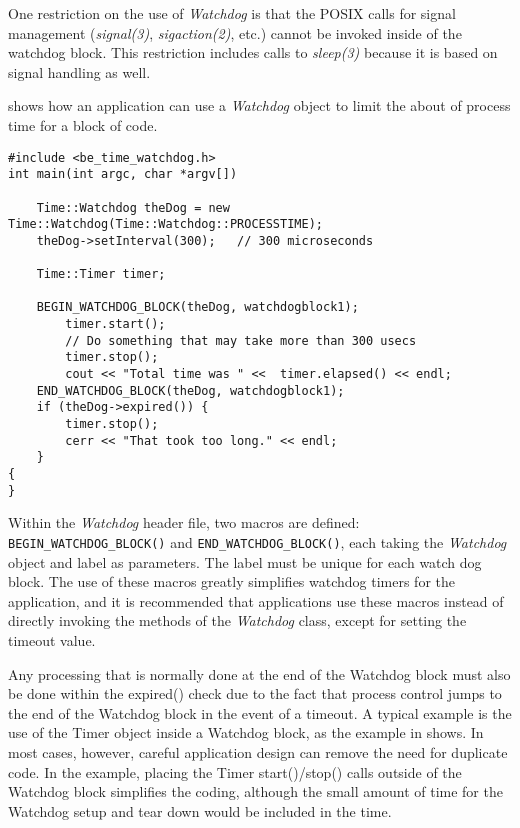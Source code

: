 One restriction on the use of {\em Watchdog} is that the POSIX calls for
signal management ({\em signal(3)}, {\em sigaction(2)}, etc.) cannot be
invoked inside of the watchdog block. This restriction includes calls to
{\em sleep(3)} because it is based on signal handling as well.

 shows how an application can use a {\em Watchdog}
object to limit the about of process time for a block of code.

\begin{lstlisting}[caption={Using the Watchdog}, label=watchdoguse]
#include <be_time_watchdog.h>
int main(int argc, char *argv[])

    Time::Watchdog theDog = new Time::Watchdog(Time::Watchdog::PROCESSTIME);
    theDog->setInterval(300);	// 300 microseconds

    Time::Timer timer;

    BEGIN_WATCHDOG_BLOCK(theDog, watchdogblock1);
        timer.start();
        // Do something that may take more than 300 usecs
        timer.stop();
        cout << "Total time was " <<  timer.elapsed() << endl;
    END_WATCHDOG_BLOCK(theDog, watchdogblock1);
    if (theDog->expired()) {
        timer.stop();
        cerr << "That took too long." << endl;
    }
{
}
\end{lstlisting}

Within the {\em Watchdog} header file, two macros are defined:
{\tt BEGIN\_WATCHDOG\_BLOCK()} and {\tt END\_WATCHDOG\_BLOCK()}, each taking
the {\em Watchdog} object and label as parameters. The label must be unique
for each watch dog block.  The use of these macros greatly simplifies
watchdog timers for the application, and it is recommended that applications
use these macros instead of directly invoking the methods of the
{\em Watchdog} class, except for setting the timeout value.

Any processing that is normally done at the end of the Watchdog block must also
be done within the expired() check
due to the fact that process control jumps to the end of the Watchdog block
in the event of a timeout.
A typical example is the use of the Timer
object inside a Watchdog block, as the example in 
shows. In most cases, however, careful application design can remove the need
for duplicate code. In the example, placing the Timer start()/stop() calls
outside of the Watchdog block simplifies the coding, although the small amount
of time for the Watchdog setup and tear down would be included in the time.
